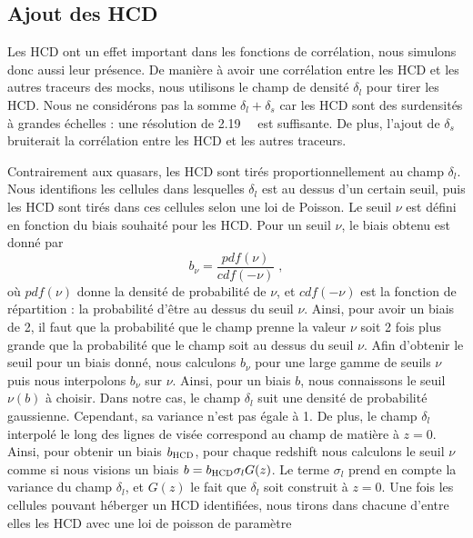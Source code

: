 \documentclass[11pt, twoside, a4paper, openright]{report}
\begin{document}
\subsection{Ajout des HCD}
\label{subsec:hcd}
Les HCD ont un effet important dans les fonctions de corrélation, nous simulons donc aussi leur présence. De manière à avoir une corrélation entre les HCD et les autres traceurs des mocks, nous utilisons le champ de densité $\delta_l$ pour tirer les HCD. Nous ne considérons pas la somme $\delta_l + \delta_s$ car les HCD sont des surdensités à grandes échelles : une résolution de \SI{2.19}{\perh\Mpc} est suffisante. De plus, l'ajout de $\delta_s$ bruiterait la corrélation entre les HCD et les autres traceurs.

Contrairement aux quasars, les HCD sont tirés proportionnellement au champ $\delta_l$. Nous identifions les cellules dans lesquelles $\delta_l$ est au dessus d'un certain seuil, puis les HCD sont tirés dans ces cellules selon une loi de Poisson. Le seuil $\nu$ est défini en fonction du biais souhaité pour les HCD. Pour un seuil $\nu$, le biais obtenu est donné par
\begin{equation}
  b_{\nu} = \frac{pdf(\nu)}{cdf(-\nu)} \; ,
\end{equation}
où $pdf(\nu)$ donne la densité de probabilité de $\nu$, et $cdf(-\nu)$ est la fonction de répartition : la probabilité d'être au dessus du seuil $\nu$. Ainsi, pour avoir un biais de 2, il faut que la probabilité que le champ prenne la valeur $\nu$ soit 2 fois plus grande que la probabilité que le champ soit au dessus du seuil $\nu$. Afin d'obtenir le seuil pour un biais donné, nous calculons $b_{\nu}$ pour une large gamme de seuils $\nu$ puis nous interpolons $b_{\nu}$ sur $\nu$. Ainsi, pour un biais $b$, nous connaissons le seuil $\nu(b)$ à choisir.
Dans notre cas, le champ $\delta_l$ suit une densité de probabilité gaussienne. Cependant, sa variance n'est pas égale à 1. De plus, le champ $\delta_l$ interpolé le long des lignes de visée correspond au champ de matière à $z=0$. Ainsi, pour obtenir un biais $b_{\textsc{HCD}}$, pour chaque redshift nous  calculons le seuil $\nu$ comme si nous visions un biais $b = b_{\textsc{HCD}} \sigma_l G(z)$. Le terme $\sigma_l$ prend en compte la variance du champ $\delta_l$, et $G(z)$ le fait que $\delta_l$ soit construit à $z=0$.
Une fois les cellules pouvant héberger un HCD identifiées, nous tirons dans chacune d'entre elles les HCD avec une loi de poisson de paramètre
\end{document}
